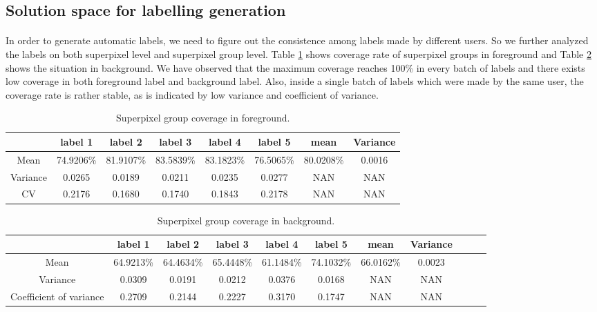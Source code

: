 \documentclass[runningheads,a4paper]{llncs}
\begin{document}
\subsection{Solution space for labelling generation}
\paragraph{} In order to generate automatic labels, we need to figure out the consistence among labels made by different users. So we further analyzed the labels on both superpixel level and superpixel group level. Table \ref{ta: label coverage f} shows coverage rate of superpixel groups in foreground and Table \ref{ta: label coverage b} shows the situation in background.
We have observed that the maximum coverage reaches 100\% in every batch of labels and there exists low coverage in both foreground label and background label. Also, inside a single batch of labels which were made by the same user, the coverage rate is rather stable, as is indicated by low variance and coefficient of variance. 


\begin{table}
\centering
\begin{tabular}{|c|c|c|c|c|c|c|c|}
\hline
 & label 1 & label 2&label 3&label 4&label 5&mean&Variance\\
\hline
Mean& 74.9206\% & 81.9107\% & 83.5839\%& 83.1823\%& 76.5065\%&80.0208\%&0.0016 \\
\hline
Variance& 0.0265 & 0.0189 & 0.0211& 0.0235& 0.0277&NAN&NAN \\
\hline
CV& 0.2176 & 0.1680 & 0.1740& 0.1843& 0.2178&NAN&NAN \\
\hline
\end{tabular}
\caption{Superpixel group coverage in foreground.}
\label{ta: label coverage f}
\end{table} 

\begin{table}
\centering
\begin{tabular}{|c|c|c|c|c|c|c|c|c|c|c|}
\hline
 & label 1 & label 2&label 3&label 4&label 5&mean&Variance \\
\hline
Mean& 64.9213\% & 64.4634\% & 65.4448\%& 61.1484\%& 74.1032\%&66.0162\%&0.0023 \\
\hline
Variance& 0.0309 & 0.0191 & 0.0212& 0.0376& 0.0168&NAN&NAN \\
\hline
Coefficient of variance& 0.2709 & 0.2144 & 0.2227& 0.3170& 0.1747&NAN&NAN \\
\hline
\end{tabular}
\caption{Superpixel group coverage in background.}
\label{ta: label coverage b}
\end{table} 
\end{document}
